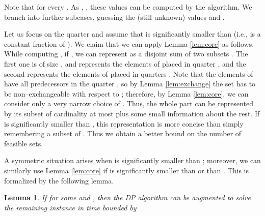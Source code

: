\documentclass{article}
\newtheorem{lemma}[theorem]{Lemma}
\theoremstyle{definition}
\begin{document}
Note that  for every .
As , , these values can be computed by the algorithm.
We branch into  further subcases, guessing the (still unknown) values  and .

Let us focus on the quarter  and assume that  is significantly smaller than  (i.e.,  is a constant fraction of ).
We claim that we can apply Lemma \ref{lem:core} as follows.
While computing , if , we can represent  as a disjoint sum of two subsets . The first one
is of size , and represents the elements of  placed in quarter , and the second represents the elements
of  placed in quarters . Note that the elements of  have all predecessors in the quarter , so by Lemma \ref{lem:exchange} the set  has to be non--exchangeable with respect to ; therefore, by Lemma \ref{lem:core}, we can consider only a very narrow choice of
. Thus, the whole part  can be represented by its subset of cardinality at most  plus some small information about the rest. If  is significantly smaller than , this representation is more concise than simply remembering a subset of . Thus we obtain a better bound on the number of feasible sets.

A symmetric situation arises when  is significantly smaller than ; moreover, we can similarly use Lemma \ref{lem:core} if  is significantly smaller than  or  than . This is formalized by the following lemma.
\begin{lemma}\label{lem:quarters0}
If  for some   and ,
then the DP algorithm can be augmented to solve the remaining instance in time bounded by

\end{lemma}
\end{document}
